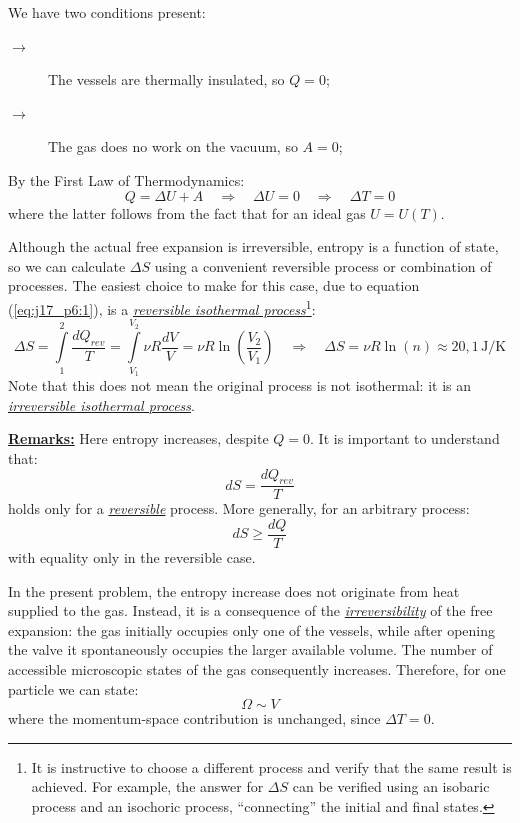 \newpage
{}
We have two conditions present:
\begin{description}
	\item[$\rightarrow$] The vessels are thermally insulated, so $Q = 0$;
	\item[$\rightarrow$] The gas does no work on the vacuum, so $A = 0$;
\end{description}
By the First Law of Thermodynamics:
\begin{equation*}
	Q = \Delta U + A
	\quad\Rightarrow\quad
	\Delta U = 0
	\quad\Rightarrow\quad
	\boxed{\Delta T = 0}
	\tag{$1$}
	\label{eq:j17_p6:1}
\end{equation*}
where the latter follows from the fact that for an ideal gas $U = U(T)$.

Although the actual free expansion is irreversible, entropy is a function of state, so we can calculate $\Delta S$ using a convenient reversible process or combination of processes. The easiest choice to make for this case, due to equation (\ref{eq:j17_p6:1}), is a \emph{\underline{reversible isothermal process}}\footnote{It is instructive to choose a different process and verify that the same result is achieved. For example, the answer for $\Delta S$ can be verified using an isobaric process and an isochoric process, ``connecting'' the initial and final states.}:
\begin{equation*}
	\Delta S = \int\limits_1^2 \frac{dQ_{rev}}{T}
	=
	\int\limits_{V_1}^{V_2}
	\nu R \frac{dV}{V}
	=
	\nu R \ln\left(\frac{V_2}{V_1}\right)
	\quad\Rightarrow\quad
	\boxed{\Delta S = \nu R \ln(n) \approx 20{,}1\,\mathrm{J/K}}
	\tag{$2$}
	\label{eq:j17_p6_2}
\end{equation*}
Note that this does not mean the original process is not isothermal: it is an \emph{\underline{irreversible isothermal process}}.

\textbf{\underline{Remarks:}} Here entropy increases, despite $Q = 0$. It is important to understand that:
\begin{equation*}
	dS = \frac{dQ_{rev}}{T}
\end{equation*}
holds only for a \emph{\underline{reversible}} process. More generally, for an arbitrary process:
\begin{equation*}
	\boxed{dS \geq \frac{dQ}{T}}
\end{equation*}
with equality only in the reversible case.

In the present problem, the entropy increase does not originate from heat supplied to the gas. Instead, it is a consequence of the \emph{\underline{irreversibility}} of the free expansion: the gas initially occupies only one of the vessels, while after opening the valve it spontaneously occupies the larger available volume. The number of accessible microscopic states of the gas consequently increases. Therefore, for one particle we can state:
\begin{equation*}
	\Omega \sim V
\end{equation*}
where the momentum-space contribution is unchanged, since  $\Delta T = 0$.

